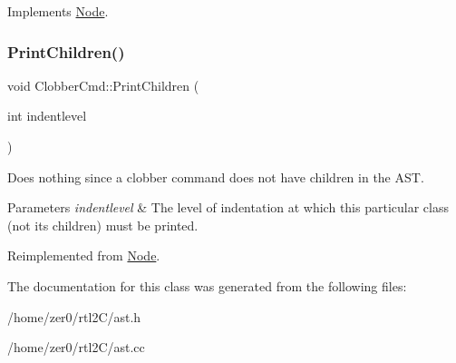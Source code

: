 Implements \hyperlink{class_node_a56e29657306ffb004d69c6929ae44269}{Node}.

\mbox{\label{class_clobber_cmd_a45fe80d35161dd6a32ed5d36bd07a5ca}} 
\subsubsection{\texorpdfstring{Print\+Children()}{PrintChildren()}}
{\footnotesize\ttfamily void Clobber\+Cmd\+::\+Print\+Children (\begin{DoxyParamCaption}\item[{int}]{indentlevel }\end{DoxyParamCaption})\hspace{0.3cm}{\ttfamily [virtual]}}

Does nothing since a clobber command does not have children in the A\+ST. 
\begin{DoxyParams}{Parameters}
{\em indentlevel} & The level of indentation at which this particular class (not its children) must be printed. \\
\hline
\end{DoxyParams}


Reimplemented from \hyperlink{class_node_a3e67ec8d22182b721717af14fe0c3000}{Node}.



The documentation for this class was generated from the following files\+:\begin{DoxyCompactItemize}
\item 
/home/zer0/rtl2\+C/ast.\+h\item 
/home/zer0/rtl2\+C/ast.\+cc\end{DoxyCompactItemize}
